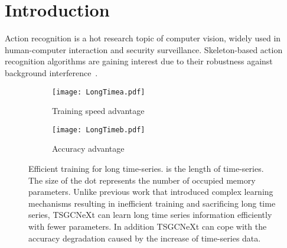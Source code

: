 \documentclass[10pt,twocolumn,letterpaper]{article}
\begin{document}
\section{Introduction}
\label{sec:introduction}
Action recognition is a hot research topic of computer vision, widely used in human-computer interaction and security surveillance. Skeleton-based action recognition algorithms are gaining interest due to their robustness against background interference~\cite{weinland2011survey}. 

\begin{figure}\centering
     \begin{subfigure}[b]{0.235\textwidth}
         \centering
         \texttt{[image: LongTimea.pdf]}
         \caption{Training speed advantage}
         \label{1(a)}
    \end{subfigure}
    \begin{subfigure}[b]{0.235\textwidth}
         \centering
         \texttt{[image: LongTimeb.pdf]}
         \caption{Accuracy advantage}
         \label{1(b)}
    \end{subfigure}
    \caption{Efficient training for long time-series.  is the length of time-series. The size of the dot represents the number of occupied memory parameters. Unlike previous work that introduced complex learning mechanisms resulting in inefficient training and sacrificing long time series, TSGCNeXt can learn long time series information efficiently with fewer parameters. In addition TSGCNeXt can cope with the accuracy degradation caused by the increase of time-series data.}
    \label{fig:longtime}
    \vspace{-1em}
\end{figure}
\end{document}
